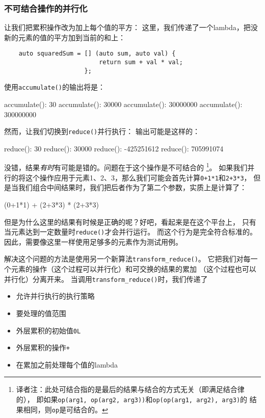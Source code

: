 \subsubsection{不可结合操作的并行化}\label{ch22.6.1.3}
让我们把累积操作改为加上每个值的平方：
这里，我们传递了一个lambda，把没新的元素的值的平方加到当前的和上：
\begin{lstlisting}
    auto squaredSum = [] (auto sum, auto val) {
                          return sum + val * val;
                      };
\end{lstlisting}
使用\texttt{accumulate()}的输出将是：
\begin{blacklisting}
    accumulate(): 30
    accumulate(): 30000
    accumulate(): 30000000
    accumulate(): 300000000
\end{blacklisting}
然而，让我们切换到\texttt{reduce()}并行执行：
输出可能是这样的：
\begin{blacklisting}
    reduce():     30
    reduce():     30000
    reduce():     -425251612
    reduce():     705991074
\end{blacklisting}
没错，结果\emph{有时}有可能是错的。问题在于这个操作是不可结合的\label{transform动机}
\footnote{译者注：此处可结合指的是最后的结果与结合的方式无关（即满足结合律的），
即如果\texttt{op(arg1, op(arg2, arg3))}和\texttt{op(op(arg1, arg2), arg3)}的
结果相同，则\texttt{op}是可结合的。}。
如果我们并行的将这个操作应用于元素1、2、3，那么我们可能会首先计算\texttt{0+1*1}和\texttt{2+3*3}，
但是当我们组合中间结果时，我们把后者作为了第二个参数，实质上是计算了：
\begin{blacklisting}
    (0+1*1) + (2+3*3) * (2+3*3)
\end{blacklisting}
但是为什么这里的结果有时候是正确的呢？好吧，看起来是在这个平台上，
只有当元素达到一定数量时\texttt{reduce()}才会并行运行。
而这个行为是完全符合标准的。因此，需要像这里一样使用足够多的元素作为测试用例。

解决这个问题的方法是使用另一个新算法\texttt{transform\_reduce()}。
它把我们对每一个元素的操作（这个过程可以并行化）和可交换的结果的累加
（这个过程也可以并行化）分离开来。
当调用\texttt{transform\_reduce()}时，我们传递了
\begin{itemize}
    \item 允许并行执行的执行策略
    \item 要处理的值范围
    \item 外层累积的初始值\texttt{0L}
    \item 外层累积的操作\texttt{+}
    \item 在累加之前处理每个值的lambda
\end{itemize}

